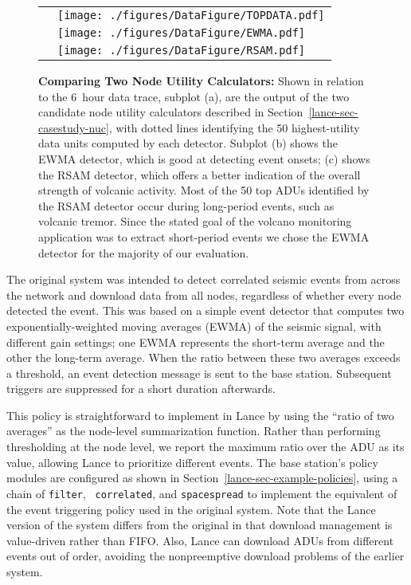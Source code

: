 \begin{figure}[t]
\begin{center}
\begin{tabular}{ll}
\raisebox{0.35in}{\parbox{0.05in}{\textbf{(a)}}} & 
\texttt{[image: ./figures/DataFigure/TOPDATA.pdf]}
\vspace{-0.05in}\\
\raisebox{0.31in}{\parbox{0.05in}{\textbf{(b)}}} & 
\texttt{[image: ./figures/DataFigure/EWMA.pdf]}
\vspace{-0.05in}\\
\raisebox{0.32in}{\parbox{0.05in}{\textbf{(c)}}} & 
\texttt{[image: ./figures/DataFigure/RSAM.pdf]}
\end{tabular}
\end{center}

\caption{\textbf{Comparing Two Node Utility Calculators:} Shown in relation
to the 6~hour data trace, subplot (a), are the output of the two candidate
node utility calculators described in Section~\ref{lance-sec-casestudy-nuc},
with dotted lines identifying the 50 highest-utility data units computed by
each detector. Subplot (b) shows the EWMA detector, which is good at
detecting event onsets; (c) shows the RSAM detector, which offers a better
indication of the overall strength of volcanic activity. Most of the 50 top
ADUs identified by the RSAM detector occur during long-period events, such as
volcanic tremor. Since the stated goal of the volcano monitoring application
was to extract short-period events we chose the EWMA detector for the
majority of our evaluation.}

\label{lance-fig-nucplot}
\end{figure}

The original system was intended to detect correlated seismic events from
across the network and download data from all nodes, regardless of whether
every node detected the event. This was based on a simple event detector that
computes two exponentially-weighted moving averages (EWMA) of the seismic
signal, with different gain settings; one EWMA represents the short-term
average and the other the long-term average. When the ratio between these two
averages exceeds a threshold, an event detection message is sent to the base
station. Subsequent triggers are suppressed for a short duration afterwards.

This policy is straightforward to implement in Lance by using the ``ratio of
two averages'' as the node-level summarization function.  Rather than
performing thresholding at the node level, we report the maximum ratio over
the ADU as its value, allowing Lance to prioritize different events. The base
station's policy modules are configured as shown in
Section~\ref{lance-sec-example-policies}, using a chain of {\tt filter}, {\tt
correlated}, and {\tt spacespread} to implement the equivalent of the event
triggering policy used in the original system. Note that the Lance version of
the system differs from the original in that download management is
value-driven rather than FIFO. Also, Lance can download ADUs from different
events out of order, avoiding the nonpreemptive download problems of the
earlier system.

